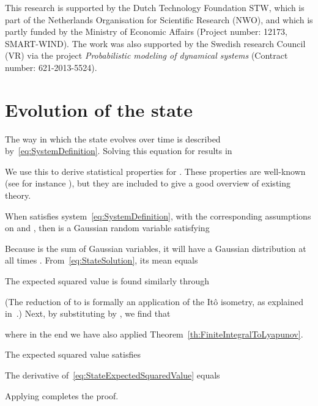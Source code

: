 \documentclass[twocolumn]{autart}
\begin{document}
\begin{ack}
This research is supported by the Dutch Technology Foundation STW, which is part of the Netherlands Organisation for Scientific Research (NWO), and which is partly funded by the Ministry of Economic Affairs (Project number: 12173, SMART-WIND). The work was also supported by the Swedish research Council (VR) via the project \emph{Probabilistic modeling of dynamical systems} (Contract number: 621-2013-5524).
\end{ack}

\appendix

\section{Evolution of the state} \label{s:StateEvolution}

The way in which the state  evolves over time is described by~\eqref{eq:SystemDefinition}. Solving this equation for  results in

We use this to derive statistical properties for . These properties are well-known (see for instance \cite{DMCSBook}), but they are included to give a good overview of existing theory.

\begin{thm}\label{th:PropertiesOfStateProcess}
When  satisfies system~\eqref{eq:SystemDefinition}, with the corresponding assumptions on  and , then  is a Gaussian random variable satisfying

\end{thm}
\begin{pf}
Because  is the sum of Gaussian variables, it will have a Gaussian distribution at all times . From~\eqref{eq:StateSolution}, its mean equals

The expected squared value is found similarly through

(The reduction of  to  is formally an application of the It\^o isometry, as explained in~\cite{StochasticDEBook}.) Next, by substituting  by , we find that

where in the end we have also applied Theorem~\ref{th:FiniteIntegralToLyapunov}.
\end{pf}

\begin{thm}\label{th:StateProcessDerivative}
The expected squared value  satisfies

\end{thm}
\begin{pf}
The derivative of~\eqref{eq:StateExpectedSquaredValue} equals

Applying  completes the proof.
\end{pf}
\end{document}
